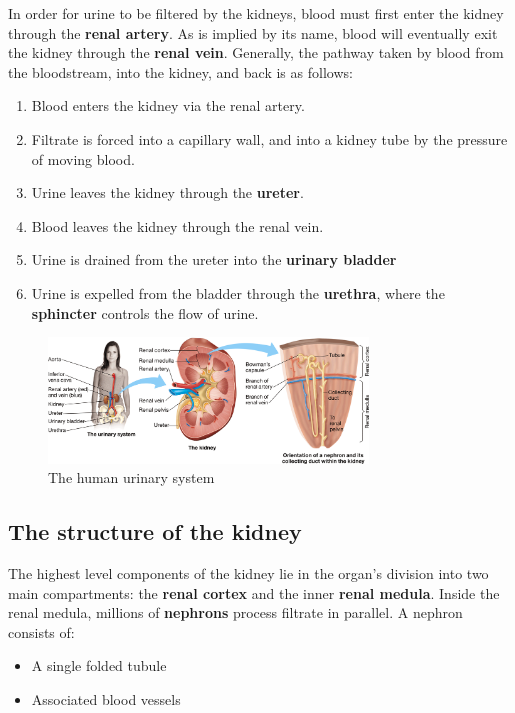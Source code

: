 \documentclass{article}
\begin{document}
In order for urine to be filtered by the kidneys, blood must first enter the
kidney through the \textbf{renal artery}. As is implied by its name, blood will
eventually exit the kidney through the \textbf{renal vein}. Generally, the
pathway taken by blood from the bloodstream, into the kidney, and back is as
follows:

\begin{enumerate}
	\item Blood enters the kidney via the renal artery.
	\item Filtrate is forced into a capillary wall, and into a kidney tube by
		the pressure of moving blood.
	\item Urine leaves the kidney through the \textbf{ureter}.
	\item Blood leaves the kidney through the renal vein.
	\item Urine is drained from the ureter into the \textbf{urinary bladder}
	\item Urine is expelled from the bladder through the \textbf{urethra},
		where the \textbf{sphincter} controls the flow of urine.
\end{enumerate}

\begin{figure}[h]
	\centering
	\includegraphics[width=8.5cm]{urinary_system.png}
	\caption{The human urinary system}
\end{figure}

\subsection{The structure of the kidney}

The highest level components of the kidney lie in the organ's division into two
main compartments: the \textbf{renal cortex} and the inner \textbf{renal
medula}. Inside the renal medula, millions of \textbf{nephrons} process
filtrate in parallel. A nephron consists of:

\begin{itemize}
	\item A single folded tubule
	\item Associated blood vessels
\end{itemize}
\end{document}
